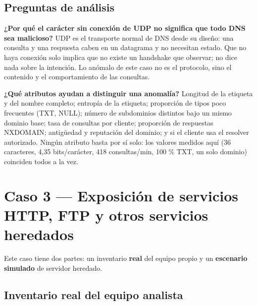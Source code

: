 \subsection{Preguntas de análisis}

\textbf{¿Por qué el carácter sin conexión de UDP no significa que todo DNS sea malicioso?} UDP es el transporte normal de DNS desde su diseño: una consulta y una respuesta caben en un datagrama y no necesitan estado. Que no haya conexión solo implica que no existe un handshake que observar; no dice nada sobre la intención. Lo anómalo de este caso no es el protocolo, sino el contenido y el comportamiento de las consultas.

\textbf{¿Qué atributos ayudan a distinguir una anomalía?} Longitud de la etiqueta y del nombre completo; entropía de la etiqueta; proporción de tipos poco frecuentes (TXT, NULL); número de subdominios distintos bajo un mismo dominio base; tasa de consultas por cliente; proporción de respuestas NXDOMAIN; antigüedad y reputación del dominio; y si el cliente usa el resolver autorizado. Ningún atributo basta por sí solo: los valores medidos aquí (36 caracteres, 4,35 bits/carácter, 418 consultas/min, 100 \% TXT, un solo dominio) coinciden todos a la vez.

\section{Caso 3 --- Exposición de servicios HTTP, FTP y otros servicios heredados}

Este caso tiene dos partes: un inventario \textbf{real} del equipo propio y un \textbf{escenario simulado} de servidor heredado.

\subsection{Inventario real del equipo analista}


